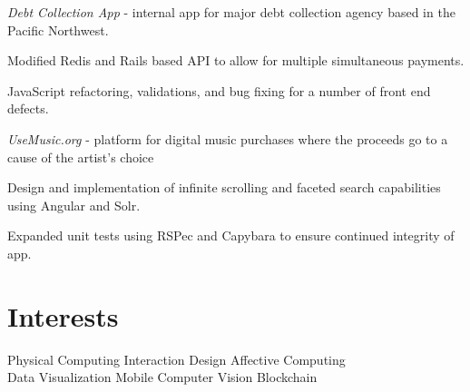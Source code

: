 \documentclass[]{deedy-resume-openfont}
\begin{document}
\begin{minipage}[t]{0.66\textwidth}
\textit{Debt Collection App} - internal app for major debt collection agency based in the Pacific Northwest.
\begin{tightemize}
\item Modified Redis and Rails based API to allow for multiple simultaneous payments.
\item JavaScript refactoring, validations, and bug fixing for a number of front end defects.
\end{tightemize}
\textit{UseMusic.org} - platform for digital music purchases where the proceeds go to a cause of the artist’s choice
\begin{tightemize}
\item Design and implementation of infinite scrolling and faceted search capabilities using Angular and Solr.
\item Expanded unit tests using RSPec and Capybara to ensure continued integrity of app.
\end{tightemize}
\sectionsep

\runsubsection{}
\sectionsep

\runsubsection{}
\sectionsep

\runsubsection{}
\sectionsep

\section{Interests}
\textbullet{} Physical Computing \textbullet{} Interaction Design \textbullet{} Affective Computing \\ \textbullet{} Data Visualization  \textbullet{} Mobile \textbullet{} Computer Vision \textbullet{} Blockchain

\end{minipage} 
\end{document}
